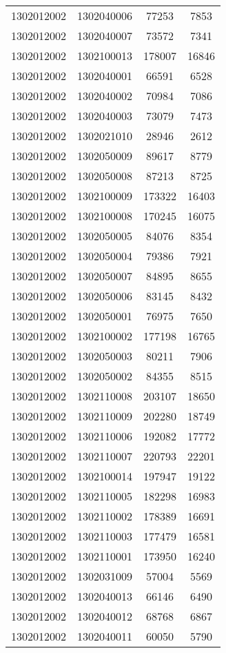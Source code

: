 \begin{longtable}{llcc}
1302012002 & 1302040006 & 77253 & 7853\\
1302012002 & 1302040007 & 73572 & 7341\\
1302012002 & 1302100013 & 178007 & 16846\\
1302012002 & 1302040001 & 66591 & 6528\\
1302012002 & 1302040002 & 70984 & 7086\\
1302012002 & 1302040003 & 73079 & 7473\\
1302012002 & 1302021010 & 28946 & 2612\\
1302012002 & 1302050009 & 89617 & 8779\\
1302012002 & 1302050008 & 87213 & 8725\\
1302012002 & 1302100009 & 173322 & 16403\\
1302012002 & 1302100008 & 170245 & 16075\\
1302012002 & 1302050005 & 84076 & 8354\\
1302012002 & 1302050004 & 79386 & 7921\\
1302012002 & 1302050007 & 84895 & 8655\\
1302012002 & 1302050006 & 83145 & 8432\\
1302012002 & 1302050001 & 76975 & 7650\\
1302012002 & 1302100002 & 177198 & 16765\\
1302012002 & 1302050003 & 80211 & 7906\\
1302012002 & 1302050002 & 84355 & 8515\\
1302012002 & 1302110008 & 203107 & 18650\\
1302012002 & 1302110009 & 202280 & 18749\\
1302012002 & 1302110006 & 192082 & 17772\\
1302012002 & 1302110007 & 220793 & 22201\\
1302012002 & 1302100014 & 197947 & 19122\\
1302012002 & 1302110005 & 182298 & 16983\\
1302012002 & 1302110002 & 178389 & 16691\\
1302012002 & 1302110003 & 177479 & 16581\\
1302012002 & 1302110001 & 173950 & 16240\\
1302012002 & 1302031009 & 57004 & 5569\\
1302012002 & 1302040013 & 66146 & 6490\\
1302012002 & 1302040012 & 68768 & 6867\\
1302012002 & 1302040011 & 60050 & 5790\\

\end{longtable}
